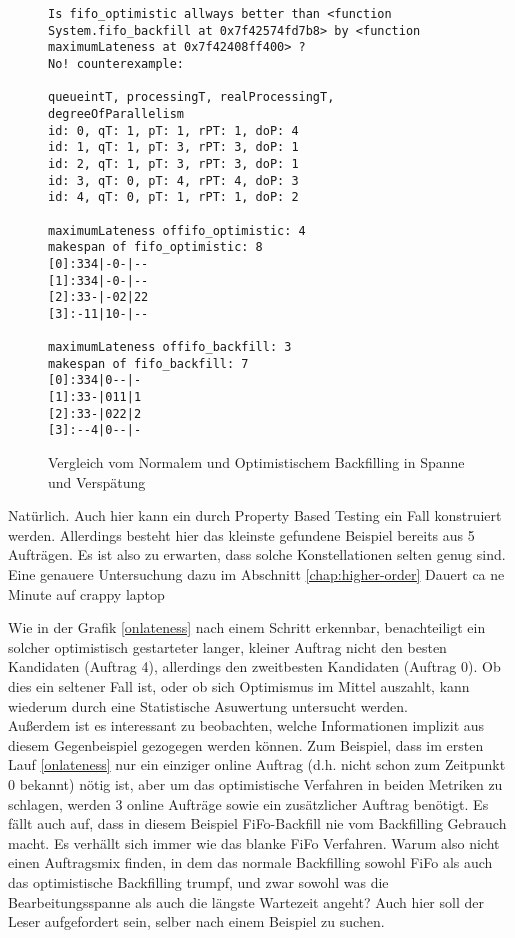 \begin{figure}
\centering
\begin{verbatim}
Is fifo_optimistic allways better than <function System.fifo_backfill at 0x7f42574fd7b8> by <function maximumLateness at 0x7f42408ff400> ?
No! counterexample:

queueintT, processingT, realProcessingT, degreeOfParallelism
id: 0, qT: 1, pT: 1, rPT: 1, doP: 4
id: 1, qT: 1, pT: 3, rPT: 3, doP: 1
id: 2, qT: 1, pT: 3, rPT: 3, doP: 1
id: 3, qT: 0, pT: 4, rPT: 4, doP: 3
id: 4, qT: 0, pT: 1, rPT: 1, doP: 2

maximumLateness offifo_optimistic: 4
makespan of fifo_optimistic: 8
[0]:334|-0-|--
[1]:334|-0-|--
[2]:33-|-02|22
[3]:-11|10-|--

maximumLateness offifo_backfill: 3
makespan of fifo_backfill: 7
[0]:334|0--|-
[1]:33-|011|1
[2]:33-|022|2
[3]:--4|0--|-
\end{verbatim}
\caption{Vergleich vom Normalem und Optimistischem Backfilling in Spanne und Verspätung}
\label{onlatenessmakespan}
\end{figure}

Natürlich. Auch hier kann ein durch Property Based Testing ein Fall konstruiert werden. Allerdings besteht hier das kleinste gefundene Beispiel bereits aus 5 Aufträgen. Es ist also zu erwarten, dass solche Konstellationen selten genug sind. Eine genauere Untersuchung dazu im Abschnitt \ref{chap:higher-order}
Dauert ca ne Minute auf crappy laptop\\
\FloatBarrier

Wie in der Grafik \ref{onlateness} nach einem Schritt erkennbar, benachteiligt ein solcher optimistisch gestarteter langer, kleiner Auftrag nicht den besten Kandidaten (Auftrag 4), allerdings den zweitbesten Kandidaten (Auftrag 0). Ob dies ein seltener Fall ist, oder ob sich Optimismus im Mittel auszahlt, kann wiederum durch eine Statistische Asuwertung untersucht werden.\\

Außerdem ist es interessant zu beobachten, welche Informationen implizit aus diesem Gegenbeispiel gezogegen werden können. Zum Beispiel, dass im ersten Lauf \ref{onlateness} nur ein einziger online Auftrag (d.h. nicht schon zum Zeitpunkt 0 bekannt) nötig ist, aber um das optimistische Verfahren in beiden Metriken zu schlagen, werden 3 online Aufträge sowie ein zusätzlicher Auftrag benötigt. Es fällt auch auf, dass in diesem Beispiel FiFo-Backfill nie vom Backfilling Gebrauch macht. Es verhällt sich immer wie das blanke FiFo Verfahren. Warum also nicht einen Auftragsmix finden, in dem das normale Backfilling sowohl FiFo als auch das optimistische Backfilling trumpf, und zwar sowohl was die Bearbeitungsspanne als auch die längste Wartezeit angeht? Auch hier soll der Leser aufgefordert sein, selber nach einem Beispiel zu suchen.\\

